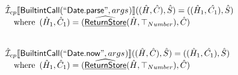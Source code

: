 \[\begin{array}{l}
\hat{\mathcal{I}} _{cp}\llbracket \mbox{\textsf{BuiltintCall}}(``\mbox{\textsf{Date.parse}}",args_{})\rrbracket((\hat{H},\hat{C}), \hat{S})
  = ((\hat{H}_1, \hat{C_1}), \hat{S})\\
\quad{\rm where}\begin{array}[t]{l}
  (\hat{H}_1, \hat{C}_1) = (\widehat{\underline{\sf ReturnStore}}(\hat{H},\top_{Number}), \hat{C})\\
  \end{array}\\
\\\\

\hat{\mathcal{I}} _{cp}\llbracket \mbox{\textsf{BuiltintCall}}(``\mbox{\textsf{Date.now}}",args_{})\rrbracket((\hat{H},\hat{C}), \hat{S})
  = ((\hat{H}_1, \hat{C_1}), \hat{S})\\
\quad{\rm where}\begin{array}[t]{l}
  (\hat{H}_1, \hat{C}_1) = (\widehat{\underline{\sf ReturnStore}}(\hat{H},\top_{Number}), \hat{C})\\
  \end{array}\\
\\\\




\end{array}
\]

